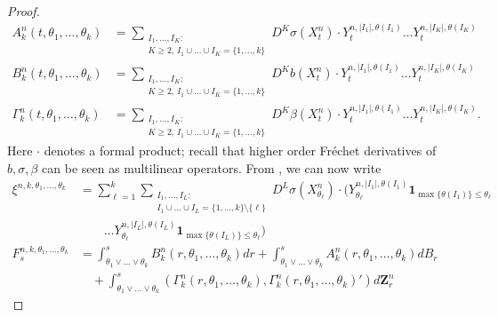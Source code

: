 \documentclass[11pt,a4paper]{article}
\theoremstyle{plain}
\begin{document}
\begin{proof}
{  \begin{align*}
      A^n_k (t,\theta_1,\dots,\theta_k) &= \sum_{ \substack{ I_1, \dots, I_K : \\ K \ge 2, \,  I_1 \cup \dots \cup I_K = \{1,\dots,k\} } } D^K \sigma(X^n_t) \cdot Y^{n,|I_1|,\theta(I_1)}_t \dots Y^{n,|I_K|,\theta(I_K)}_t
      \\
      B^n_k (t,\theta_1,\dots,\theta_k) &= \sum_{ \substack{ I_1, \dots, I_K : \\ K \ge 2, \,  I_1 \cup \dots \cup I_K = \{1,\dots,k\} } } D^K b(X_t^n) \cdot Y^{n,|I_1|,\theta(I_1)}_t \dots Y^{n,|I_K|,\theta(I_K)}_t
      \\
      \Gamma^n_k (t,\theta_1,\dots,\theta_k) &= \sum_{ \substack{ I_1, \dots, I_K : \\ K \ge 2, \,  I_1 \cup \dots \cup I_K = \{1,\dots,k\} } } D^K \beta(X^n_t) \cdot Y^{n,|I_1|,\theta(I_1)}_t \dots Y^{n,|I_K|,\theta(I_K)}_t
      . 
  \end{align*}
  Here $\cdot$ denotes a formal product; recall that higher order Fréchet derivatives of $b,\sigma,\beta$ can be seen as multilinear operators.
  From \cite[equation (2.54)]{nualart2006malliavin}, we can now write 
  \begin{equation} \label{eq:definitionofxi^nandF^n}
  \begin{aligned}
       \xi^{n,k,\theta_1,\dots,\theta_k} &= \sum_{\ell=1}^k \sum_{  \substack{ I_1, \dots, I_L : \\  I_1 \cup \dots \cup I_L = \{1,\dots,k\} \setminus \{\ell\} } } D^L \sigma (X^n_{\theta_\ell}) \cdot \Big(Y^{n,|I_1|,\theta(I_1)}_{\theta_\ell}  \mathbf{1}_{\max\{\theta(I_1)\} \le \theta_\ell} \\
       & \qquad \dots Y^{n,|I_L|,\theta(I_L)}_{\theta_\ell} \mathbf{1}_{\max\{\theta(I_L)\} \le \theta_\ell} \Big)  \\
        F_s^{n,k, \theta_1, \ldots, \theta_k} &= \int_{\theta_1 \vee \ldots \vee \theta_k}^s B^n_k(r,\theta_1,\dots,\theta_k) dr + \int_{\theta_1 \vee \ldots \vee \theta_k}^s A^n_k(r,\theta_1,\dots,\theta_k) dB_r  \\ 
        & \quad + \int_{\theta_1 \vee \ldots \vee \theta_k}^s (\Gamma^n_k(r,\theta_1,\dots,\theta_k), \Gamma^n_k(r,\theta_1,\dots,\theta_k) ') d\mathbf{Z}^n_r  
    \end{aligned}

\end{equation}}
\end{proof}
\end{document}
